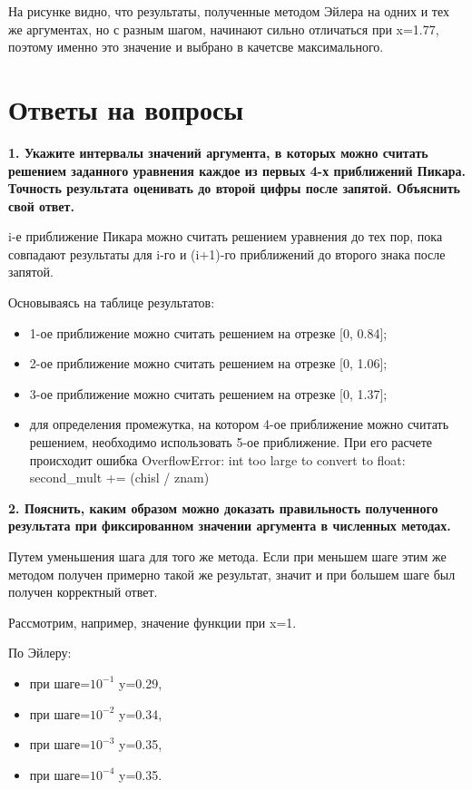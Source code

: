 \documentclass[12pt]{report}
\begin{document}
На рисунке видно, что результаты, полученные методом Эйлера на одних и тех же аргументах, но с разным шагом, начинают сильно отличаться при x=1.77, поэтому именно это значение и выбрано в качетсве максимального.

\chapter{Ответы на вопросы}

\textbf{1. Укажите интервалы значений аргумента, в которых можно считать решением заданного  уравнения каждое из первых 4-х приближений Пикара. Точность результата оценивать до второй цифры после запятой. Объяснить свой ответ.}

i-е приближение Пикара можно считать решением уравнения до тех пор, пока совпадают результаты для i-го и (i+1)-го приближений до второго знака после запятой.

Основываясь на таблице результатов:

\begin{itemize}
	\item 1-ое приближение можно считать решением на отрезке [0, 0.84];
	\item 2-ое приближение можно считать решением на отрезке [0, 1.06];
	\item 3-ое приближение можно считать решением на отрезке [0, 1.37];
	\item для определения промежутка, на котором 4-ое приближение можно считать решением, необходимо использовать 5-ое приближение. При его расчете происходит ошибка OverflowError: int too large to convert to float: second\_mult += (chisl / znam)
\end{itemize}



\textbf{2. Пояснить, каким образом можно доказать правильность полученного результата при фиксированном значении аргумента в численных методах.}

Путем уменьшения шага для того же метода. Если при меньшем шаге этим же методом получен примерно такой же результат, значит и при большем шаге был получен корректный ответ.

Рассмотрим, например, значение функции при x=1.

По Эйлеру: 
\begin{itemize}
	\item при шаге=$10^{-1}$ y=0.29, 
	\item при шаге=$10^{-2}$ y=0.34, 
	\item при шаге=$10^{-3}$ y=0.35, 
	\item при шаге=$10^{-4}$ y=0.35. 
\end{itemize}
\end{document}
